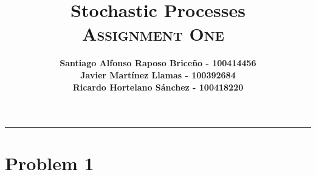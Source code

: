 \documentclass[11pt, a4paper]{article}
\title{\vspace{-8ex} \huge \bfseries Stochastic Processes\\
	\LARGE \normalfont \textsc{Assignment One} \vspace{-2ex}}
\author{\bfseries Santiago Alfonso Raposo Briceño - 100414456 \\
		\bfseries Javier Martínez Llamas - 100392684\\
		\bfseries Ricardo Hortelano Sánchez - 100418220}
\date{\vspace{-5ex}} %
\begin{document}
\maketitle
\hrule

\section{Problem 1}
\end{document}
